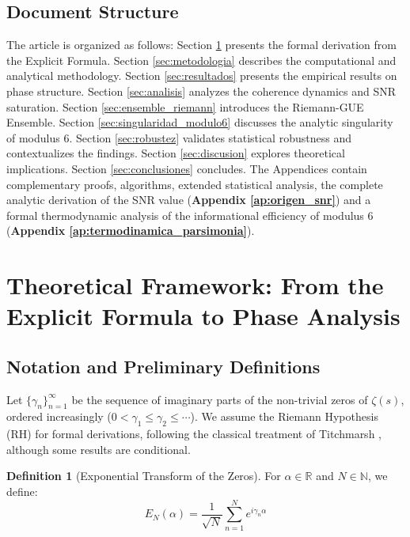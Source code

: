 \documentclass[12pt, a4paper]{article}
\theoremstyle{plain}
\theoremstyle{definition}
\newtheorem{definicion}[teorema]{Definition}
\theoremstyle{remark}
\begin{document}
\subsection{Document Structure}
\label{subsec:estructura}

The article is organized as follows: Section \ref{sec:marco_teorico} presents the formal derivation from the Explicit Formula. Section \ref{sec:metodologia} describes the computational and analytical methodology. Section \ref{sec:resultados} presents the empirical results on phase structure. Section \ref{sec:analisis} analyzes the coherence dynamics and SNR saturation. Section \ref{sec:ensemble_riemann} introduces the Riemann-GUE Ensemble. Section \ref{sec:singularidad_modulo6} discusses the analytic singularity of modulus 6. Section \ref{sec:robustez} validates statistical robustness and contextualizes the findings. Section \ref{sec:discusion} explores theoretical implications. Section \ref{sec:conclusiones} concludes. The Appendices contain complementary proofs, algorithms, extended statistical analysis, the complete analytic derivation of the SNR value (\textbf{Appendix \ref{ap:origen_snr}}) and a formal thermodynamic analysis of the informational efficiency of modulus 6 (\textbf{Appendix \ref{ap:termodinamica_parsimonia}}).

\section{Theoretical Framework: From the Explicit Formula to Phase Analysis}
\label{sec:marco_teorico}

\subsection{Notation and Preliminary Definitions}
\label{subsec:notacion}

Let $\{\gamma_n\}_{n=1}^\infty$ be the sequence of imaginary parts of the non-trivial zeros of $\zeta(s)$, ordered increasingly ($0 < \gamma_1 \leq \gamma_2 \leq \cdots$). We assume the Riemann Hypothesis (RH) for formal derivations, following the classical treatment of Titchmarsh \cite{titchmarsh1986}, although some results are conditional.

\begin{definicion}[Exponential Transform of the Zeros]
For $\alpha \in \mathbb{R}$ and $N \in \mathbb{N}$, we define:
\[
E_N(\alpha) = \frac{1}{\sqrt{N}} \sum_{n=1}^N e^{i\gamma_n \alpha}
\]
\end{definicion}
\end{document}
